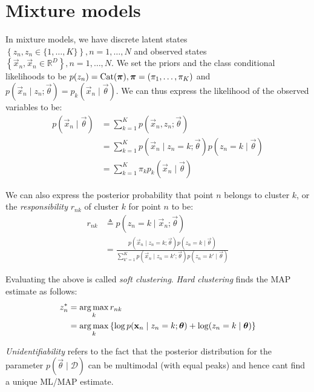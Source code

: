 \section{Mixture models}
In mixture models, we have discrete latent states $\left\{z_n, z_n \in \{1, \dotsc, K\}\right\}, n = 1, \dotsc, N$ and observed states $\left\{\vec x_n, \vec x_n \in \mathbb R^D\right\}, n = 1, \dotsc, N$. We set the priors and the class conditional likelihoods to be $p(z_n) = \operatorname{Cat}(\boldsymbol{\mathbf{\pi}}), \boldsymbol{\mathbf{\pi}} = (\pi_1, \dotsc, \pi_K)$ and $p(\vec x_n \mid z_n; \vec \theta) = p_k(\vec x_n \mid \vec \theta)$. We can thus express the likelihood of the observed variables to be:
\begin{align}
    p(\vec x_n \mid \vec \theta)    &= \sum_{k = 1}^K p(\vec x_n, z_n; \vec \theta) \nonumber\\
                                    &= \sum_{k = 1}^K p(\vec x_n \mid z_n = k; \vec \theta) p(z_n = k \mid \vec \theta) \nonumber\\
                                    &= \sum_{k = 1}^K \pi_k p_k(\vec x_n \mid \vec \theta) \label{eqn:models-mm-lik}
\end{align}

We can also express the posterior probability that point $n$ belongs to cluster $k$, or the \emph{responsibility} $r_{nk}$ of cluster $k$ for point $n$ to be:
\begin{align}
    r_{nk}  &\triangleq p(z_n = k \mid \vec x_n; \vec \theta) \nonumber\\
            &= \frac{p(\vec x_n \mid z_n = k; \vec \theta) p(z_n = k \mid \vec \theta)}{\sum_{k' = 1}^K p(\vec x_n \mid z_n = k'; \vec \theta) p(z_n = k' \mid \vec \theta)}
\end{align}

Evaluating the above is called \emph{soft clustering}. \emph{Hard clustering} finds the MAP estimate as follows:
\begin{align}
    z_n^\ast    &= \operatorname*{arg\,max}_k r_{nk} \nonumber\\
                &= \operatorname*{arg\,max}_k \left\{\log p(\boldsymbol{\mathbf{x}}_n \mid z_n = k; \boldsymbol{\mathbf{\theta}}) + \log(z_n = k \mid \boldsymbol{\mathbf{\theta}})\right\}
\end{align}

\emph{Unidentifiability} refers to the fact that the posterior distribution for the parameter $p(\vec \theta \mid \mathcal D)$ can be multimodal (with equal peaks) and hence cant find a unique ML/MAP estimate.

